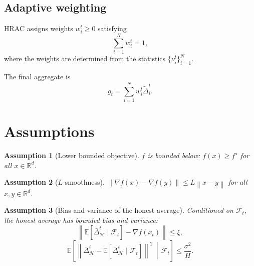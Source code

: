 \documentclass[11pt,a4paper]{article}
\newtheorem{assumption}{Assumption}
\theoremstyle{remark}
\newcommand{\R}{\mathbb{R}}
\newcommand{\E}{\mathbb{E}}
\newcommand{\F}{\mathcal{F}}
\newcommand{\HH}{\mathcal{H}}
\newcommand{\norm}[1]{\left\lVert #1 \right\rVert}
\begin{document}

\subsection{Adaptive weighting}

HRAC assigns weights \(w_i^t \ge 0\) satisfying
\begin{equation}
    \sum_{i=1}^N w_i^t = 1,
    \label{eq:weight_simplex}
\end{equation}
where the weights are determined from the statistics
\(\{\nu_i^t\}_{i=1}^N\).

The final aggregate is
\begin{equation}
    g_t = \sum_{i=1}^N w_i^t \tilde{\Delta}_i^t.
    \label{eq:aggregate}
\end{equation}

\section{Assumptions}

\begin{assumption}[Lower bounded objective]
\label{ass:lower_bounded}
\(f\) is bounded below: \(f(x)\ge f^\star\) for all \(x\in\R^d\).
\end{assumption}

\begin{assumption}[\(L\)-smoothness]
\label{ass:smooth}
\(\norm{\nabla f(x)-\nabla f(y)}\le L\norm{x-y}\) for all \(x,y\in\R^d\).
\end{assumption}

\begin{assumption}[Bias and variance of the honest average]
\label{ass:bias_variance}
Conditioned on \(\F_t\), the honest average has bounded bias and variance:
\begin{equation}
    \norm{
        \E\!\left[\bar{\Delta}_{\HH}^t \mid \F_t\right] - \nabla f(x_t)
    }
    \le \xi,
    \label{eq:bias}
\end{equation}
\begin{equation}
    \E\!\left[
        \norm{
            \bar{\Delta}_{\HH}^t -
            \E\!\left[\bar{\Delta}_{\HH}^t \mid \F_t\right]
        }^2
        \,\middle|\, \F_t
    \right]
    \le \frac{\sigma^2}{H}.
    \label{eq:variance}
\end{equation}
\end{assumption}
\end{document}
